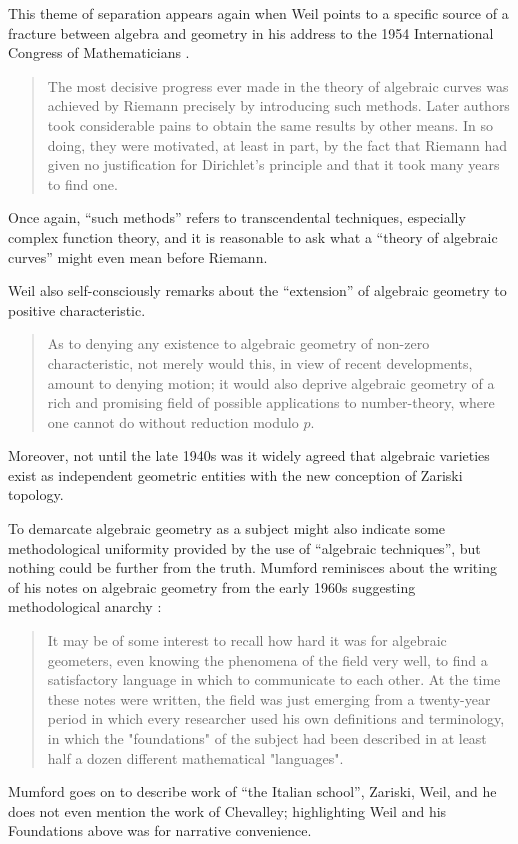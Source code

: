 \documentclass[11pt,leqno]{article}
\renewcommand{\1}{{\rm 1\hspace*{-0.4ex}%
\rule{0.1ex}{1.52ex}\hspace*{0.2ex}}}
\newcommand{\<}[1]{{\langle}#1 {\rangle}}
\newcounter{intro}
\theoremstyle{plain}
\theoremstyle{definition}
\theoremstyle{remark}
\numberwithin{equation}{subsection}
\begin{document}
This theme of separation appears again when Weil points to a specific source of a fracture between algebra and geometry in his address to the 1954 International Congress of Mathematicians \cite{Weil1956Abstract}.
\begin{quote}
	The most decisive progress ever made in the theory of algebraic curves was achieved by Riemann precisely by introducing such methods. Later authors took considerable pains to obtain the same results by other means. In so doing, they were motivated, at least in part, by the fact that Riemann had given no justification for Dirichlet's principle and that it took many years to find one. 
\end{quote}
Once again, ``such methods'' refers to transcendental techniques, especially complex function theory, and it is reasonable to ask what a ``theory of algebraic curves'' might even mean before Riemann.  

Weil also self-consciously remarks about the ``extension'' of algebraic geometry to positive characteristic.
\begin{quote}
	As to denying any existence to algebraic geometry of non-zero characteristic, not merely would this, in view of recent developments, amount to denying motion; it would also deprive
	algebraic geometry of a rich and promising field of possible applications to number-theory, where one cannot do without reduction modulo $p$.
\end{quote}
Moreover, not until the late 1940s was it widely agreed that algebraic varieties exist as independent geometric entities with the new conception of Zariski topology.

To demarcate algebraic geometry as a subject might also indicate some methodological uniformity provided by the use of ``algebraic techniques'', but nothing could be further from the truth.  Mumford reminisces about the writing of his notes on algebraic geometry from the early 1960s suggesting methodological anarchy \cite{Mumford1999RedBook}:
\begin{quote}
	It may be of some interest to recall how hard it was for algebraic geometers, even knowing the phenomena of the field very well, to find a satisfactory language in which to communicate to each other. At the time these notes were
	written, the field was just emerging from a twenty-year period in which every researcher used his own definitions and terminology, in which the "foundations" of the subject had been described in at least half a dozen different mathematical
	"languages".
\end{quote}
Mumford goes on to describe work of ``the Italian school'', Zariski, Weil, and he does not even mention the work of Chevalley; highlighting Weil and his Foundations above was for narrative convenience.  
\end{document}
